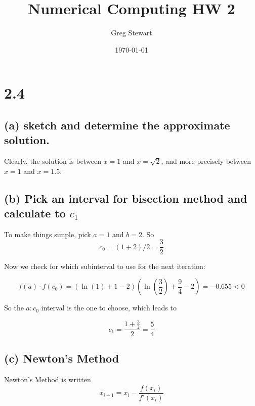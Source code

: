 \documentclass{article}[12pt]
\title{Numerical Computing HW 2}
\author{Greg Stewart}
\date{\today}
\begin{document}
\maketitle

\section*{2.4}

\subsection*{(a) \normalsize sketch and determine the approximate solution.}

\begin{center}
\end{center}

Clearly, the solution is between $x=1$ and $x=\sqrt{2}$, and more precisely between $x=1$ and $x=1.5$.

\subsection*{(b) \normalsize Pick an interval for bisection method and calculate to $c_1$}

To make things simple, pick $a = 1$ and $b = 2$. So $$c_0 = (1+2)/2 = \frac{3}{2}$$

Now we check for which subinterval to use for the next iteration:

$$f(a)\cdot f(c_0) = (\ln(1) + 1 - 2) (\ln(\frac{3}{2}) + \frac{9}{4} - 2) = -0.655 < 0$$

So the $a : c_0$ interval is the one to choose, which leads to

$$c_1 = \frac{1+\frac{3}{2}}{2} = \frac{5}{4}$$

\subsection*{(c) \normalsize Newton's Method}

Newton's Method is written $$x_{i+1} = x_i - \frac{f(x_i)}{f'(x_i)}$$
\end{document}
